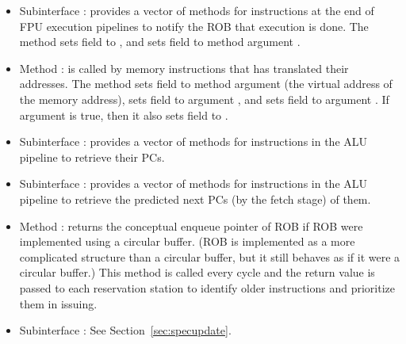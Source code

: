 \begin{itemize}
    \item Subinterface : provides a vector of methods for instructions at the end of FPU execution pipelines to notify the ROB that execution is done.
    The method sets field  to , and sets field  to method argument .
    
    \item Method : is called by memory instructions that has translated their addresses.
    The method sets field  to method argument  (the virtual address of the memory address), sets field  to argument , and sets field  to argument .
    If argument  is true, then it also sets field  to .
    
    \item Subinterface : provides a vector of methods for instructions in the ALU pipeline to retrieve their PCs.
    
    \item Subinterface : provides a vector of methods for instructions in the ALU pipeline to retrieve the predicted next PCs (by the fetch stage) of them.
    
    \item Method : returns the conceptual enqueue pointer of ROB if ROB were implemented using a circular buffer.
    (ROB is implemented as a more complicated structure than a circular buffer, but it still behaves as if it were a circular buffer.)
    This method is called every cycle and the return value is passed to each reservation station to identify older instructions and prioritize them in issuing.
    
    \item Subinterface : See Section~\ref{sec:specupdate}.
\end{itemize}

